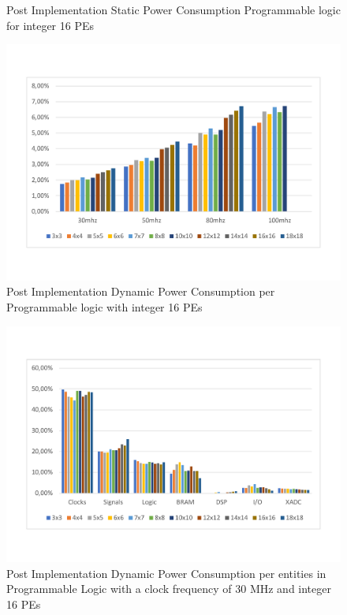 \begin{itemize}
\begin{figure}[!htbp]
\caption{Post Implementation Static Power Consumption Programmable logic for integer 16 PEs }
\label{fig:staticpowint16}
\end{figure}
\begin{figure}[!htbp]
\centering
\captionsetup{justification=centering}
\includegraphics[scale=0.5,angle=0]{./figure/graphs/power_pldyn_int16_freq.pdf}
\caption{Post Implementation Dynamic Power Consumption per Programmable logic with integer 16 PEs}
\label{fig:dynpowint16}
\end{figure}
\begin{figure}[!htbp]
\centering
\captionsetup{justification=centering}
\includegraphics[scale=0.6,angle=0]{./figure/graphs/power_pldyn_div_int16_freq_30mhz.pdf}
\caption{Post Implementation Dynamic Power Consumption per entities in Programmable Logic with a clock frequency of 30 MHz and integer 16 PEs}

\end{figure}
\end{itemize}
